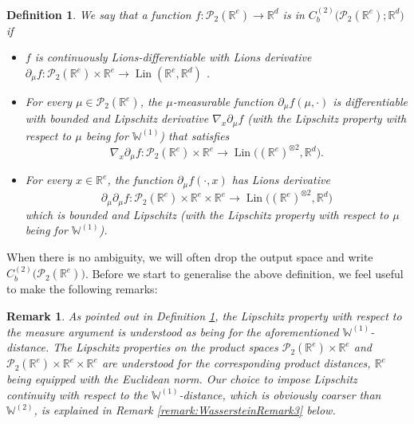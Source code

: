 \documentclass[a4paper,11pt,twoside]{article}
\numberwithin{equation}{section}
\theoremstyle{plain}
\newtheorem{definition}[theorem]{Definition}
\newtheorem{remark}[theorem]{Remark}
\newcommand{\bR}{\mathbb{R}}
\newcommand{\bW}{\mathbb{W}}
\newcommand{\cP}{\mathcal{P}}
\DeclareMathOperator{\lin}{Lin}
\newcommand{\1}{\mathbbm{1}}
\begin{document}
	\begin{definition}
		\label{definition:Twice-Different}
		We say that a function $f:\cP_2(\bR^e) \to \bR^d$ is in $C_b^{(2)}\big( \cP_2(\bR^e); \bR^d \big)$ if 
		\begin{itemize}
			\item $f$ is continuously Lions-differentiable with Lions derivative $\partial_\mu f:\cP_2(\bR^e) \times \bR^e \to \lin( \bR^e, \bR^d)$ . 
			\item For every $\mu \in \cP_2(\bR^e)$, the $\mu$-measurable function $\partial_\mu f(\mu, \cdot)$ is differentiable with bounded and Lipschitz derivative $\nabla_x \partial_\mu f$ (with the Lipschitz property with respect to $\mu$ being for $\bW^{(1)}$) that satisfies
			$$
			\nabla_x \partial_\mu f: \cP_2(\bR^e) \times \bR^e \to \lin\big( (\bR^e)^{\otimes 2}, \bR^d\big). 
			$$ 
			\item For every $x\in \bR^e$, the function $\partial_\mu f(\cdot, x)$ has Lions derivative 
			$$
			\partial_\mu \partial_\mu f: \cP_2(\bR^e) \times \bR^e \times \bR^e \to \lin\big( (\bR^e)^{\otimes 2} , \bR^d\big)
			$$
			which is bounded and Lipschitz (with the Lipschitz property with respect to $\mu$ being for $\bW^{(1)}$). 
		\end{itemize}
	\end{definition}
	When there is no ambiguity, we will often drop the output space and write $C_b^{(2)}\big( \cP_2(\bR^e) \big)$. Before we start to generalise the above definition, we feel useful to make the following remarks:
	\begin{remark}
		\label{remark:WassersteinRemark1}
		As pointed out in Definition \ref{definition:Twice-Different}, the Lipschitz property with respect to the measure argument is understood as being for the aforementioned $\bW^{(1)}$-distance. The Lipschitz properties on the product spaces $\cP_{2}(\bR^e) \times \bR^e$ and $\cP_{2}(\bR^e) \times \bR^e \times \bR^e$ are understood for the corresponding product distances, $\bR^e$ being equipped with the Euclidean norm. Our choice to impose Lipschitz continuity with respect to the $\bW^{(1)}$-distance, which is obviously coarser than $\bW^{(2)}$, is explained in Remark \ref{remark:WassersteinRemark3} below. 
	\end{remark}
	
\end{document}
